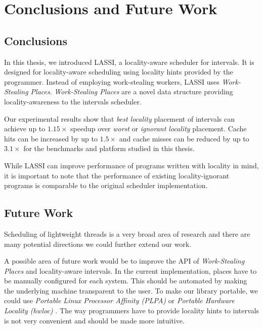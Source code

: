 
\chapter{Conclusions and Future Work}
\label{chap:locality-conclusions-and-future-work}

\section{Conclusions}
\label{sec:locality-conclusions-and-future-work-conclusions}

In this thesis, we introduced LASSI, a locality-aware scheduler for
intervals. It is designed for locality-aware scheduling using locality
hints provided by the programmer. Instead of employing work-stealing
workers, LASSI uses \emph{Work-Stealing Places}. \emph{Work-Stealing
  Places} are a novel data structure providing locality-awareness to
the intervals scheduler.

Our experimental results show that \emph{best locality} placement of
intervals can achieve up to $1.15\times$ speedup over \emph{worst} or
\emph{ignorant locality} placement. Cache hits can be increased by up
to $1.5\times$ and cache misses can be reduced by up to $3.1\times$
for the benchmarks and platform studied in this thesis.


While LASSI can improve performance of programs written with locality
in mind, it is important to note that the performance of existing
locality-ignorant programs is comparable to the original scheduler
implementation.



\section{Future Work}
\label{sec:locality-conclusions-and-future-work-future-work}

Scheduling of lightweight threads is a very broad area of research and
there are many potential directions we could further extend our work.

A possible area of future work would be to improve the API of
\emph{Work-Stealing Places} and locality-aware intervals. In the
current implementation, places have to be manually configured for each
system. This should be automated by making the underlying machine
transparent to the user. To make our library portable, we could use
\emph{Portable Linux Processor Affinity (PLPA)} \cite{OpenMPI2010a} or
\emph{Portable Hardware Locality (hwloc)} \cite{OpenMPI2010}. The way
programmers have to provide locality hints to intervals is not very
convenient and should be made more intuitive.

